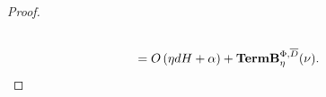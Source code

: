 \begin{proof}
\begin{align*}
\\&= O\left(\eta dH + \alpha\right) +  \textbf{\textup{TermB}}_\eta^{\Phi, \overline{D}}(\nu). 
\end{align*}



\end{proof}




    











